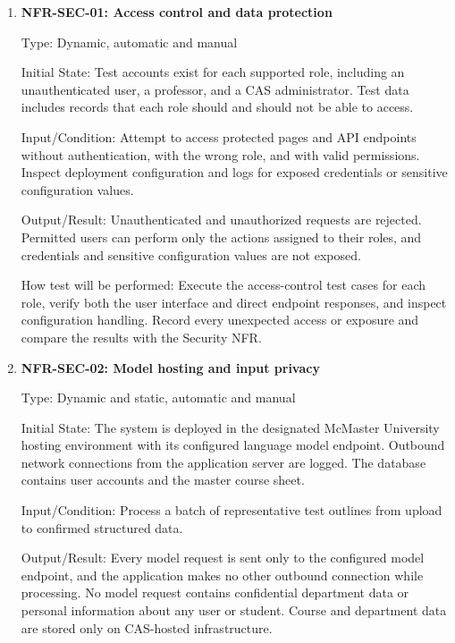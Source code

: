 \documentclass[12pt, titlepage]{article}
\begin{document}
\begin{enumerate}

\item{\label{NFR-SEC-01}\textbf{NFR-SEC-01: Access control and data protection}\\}

Type: Dynamic, automatic and manual

Initial State: Test accounts exist for each supported role, including an
unauthenticated user, a professor, and a CAS administrator. Test data
includes records that each role should and should not be able to access.

Input/Condition: Attempt to access protected pages and API endpoints without
authentication, with the wrong role, and with valid permissions. Inspect
deployment configuration and logs for exposed credentials or sensitive
configuration values.

Output/Result: Unauthenticated and unauthorized requests are rejected.
Permitted users can perform only the actions assigned to their roles, and
credentials and sensitive configuration values are not exposed.

How test will be performed: Execute the access-control test cases for each
role, verify both the user interface and direct endpoint responses, and
inspect configuration handling. Record every unexpected access or exposure
and compare the results with the Security NFR.

\item{\label{NFR-SEC-02}\textbf{NFR-SEC-02: Model hosting and input privacy}\\}

Type: Dynamic and static, automatic and manual

Initial State: The system is deployed in the designated McMaster University
hosting environment with its configured language model endpoint. Outbound
network connections from the application server are logged. The database
contains user accounts and the master course sheet.

Input/Condition: Process a batch of representative test outlines from upload
to confirmed structured data.

Output/Result: Every model request is sent only to the configured model
endpoint, and the application makes no other outbound connection while
processing. No model request contains confidential department data or
personal information about any user or student. Course and department data
are stored only on CAS-hosted infrastructure.


\end{enumerate}
\end{document}

